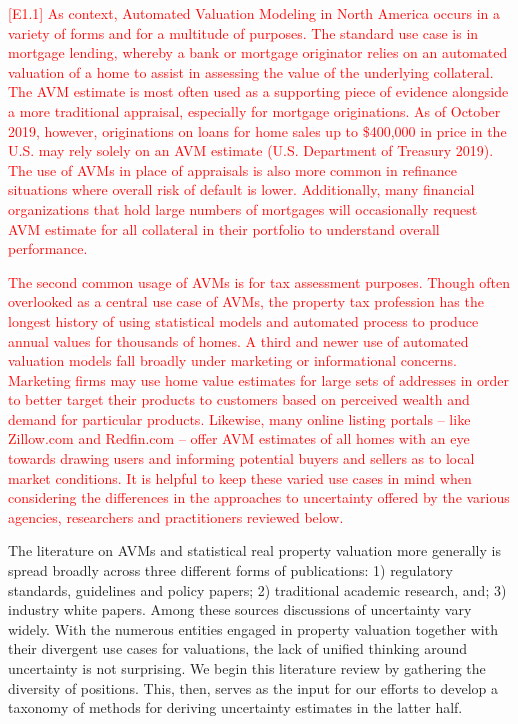 \documentclass[colTwo]{anon}
\theoremstyle{definition}
\begin{document}
\textcolor{red}{[E1.1] As context, Automated Valuation Modeling in North America occurs in a variety of forms and for a multitude of purposes. The standard use case is in mortgage lending, whereby a bank or mortgage originator relies on an automated valuation of a home to assist in assessing the value of the underlying collateral.  The AVM estimate is most often used as a supporting piece of evidence alongside a more traditional appraisal, especially for mortgage originations. As of October 2019, however, originations on loans for home sales up to \$400,000 in price in the U.S. may rely solely on an AVM estimate (U.S. Department of Treasury 2019). The use of AVMs in place of appraisals is also more common in refinance situations where overall risk of default is lower. Additionally, many financial organizations that hold large numbers of mortgages will occasionally request AVM estimate for all collateral in their portfolio to understand overall performance.}  

\textcolor{red}{ The second common usage of AVMs is for tax assessment purposes.  Though often overlooked as a central use case of AVMs, the property tax profession has the longest history of using statistical models and automated process to produce annual values for thousands of homes.  A third and newer use of automated valuation models fall broadly under marketing or informational concerns.  Marketing firms may use home value estimates for large sets of addresses in order to better target their products to customers based on perceived wealth and demand for particular products.  Likewise, many online listing portals -- like Zillow.com and Redfin.com -- offer AVM estimates of all homes with an eye towards drawing users and informing potential buyers and sellers as to local market conditions. It is helpful to keep these varied use cases in mind when considering the differences in the approaches to uncertainty offered by the various agencies, researchers and practitioners reviewed below. }   

The literature on AVMs and statistical real property valuation more generally is spread broadly across three different forms of publications: 1) regulatory standards, guidelines and policy papers; 2) traditional academic research, and; 3) industry white papers.  Among these sources discussions of uncertainty vary widely.  With the numerous entities engaged in property valuation together with their divergent use cases for valuations, the lack of unified thinking around uncertainty is not surprising.  We begin this literature review by gathering the diversity of positions.  This, then, serves as the input for our efforts to develop a taxonomy of methods for deriving uncertainty estimates in the latter half.    
\end{document}
